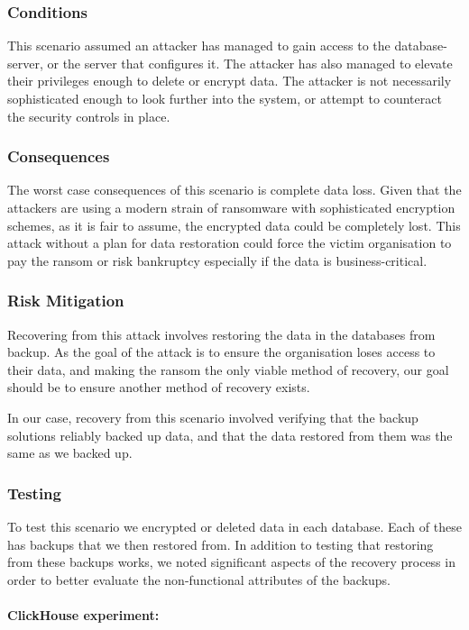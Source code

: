 \subsubsection{Conditions}
This scenario assumed an attacker has managed to gain access to the database-server, or the server that configures it. The attacker has also managed to elevate their privileges enough to delete or encrypt data. The attacker is not necessarily sophisticated enough to look further into the system,
or attempt to counteract the security controls in place. 

\subsubsection{Consequences}
The worst case consequences of this scenario is complete data loss.
Given that the attackers are using a modern strain of 
ransomware with sophisticated encryption schemes,
as it is fair to assume, the encrypted data could be completely lost.
This attack without a plan for data restoration could force the 
victim organisation to pay the ransom or risk bankruptcy 
especially if the data is business-critical. 

\subsubsection{Risk Mitigation}
Recovering from this attack involves restoring the data in the databases from backup. As the goal of the attack is to ensure the organisation loses access to their data, and making the ransom the only viable method of recovery, our goal should be to ensure another method of recovery exists. 

In our case, recovery from this scenario involved verifying that the backup solutions reliably backed up data, and that the data restored from them was the same as we backed up. 

\subsubsection{Testing}
To test this scenario we encrypted or deleted data in each database. Each of these has backups that we then restored from. In addition to testing that restoring from these backups works, we noted significant aspects of the recovery process in order to better evaluate the non-functional attributes of the backups. 

\paragraph{ClickHouse experiment:} 

